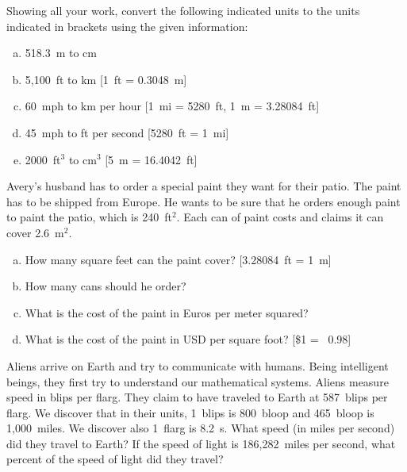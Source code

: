 \documentclass[11pt,letterpaper]{article}
\begin{document}

 Showing all your work, convert the following indicated units to the units indicated in brackets using the given information:
	\begin{enumerate}[(a)]
	\item 518.3~m to cm
	\item 5,100~ft to km [1~ft = 0.3048~m]
	\item 60~mph to km per hour [1~mi = 5280~ft, 1~m = 3.28084~ft]
	\item 45~mph to ft per second [5280~ft = 1~mi]
	\item 2000~ft$^3$ to cm$^3$ [5~m = 16.4042~ft]
	\end{enumerate}



\newpage



 Avery's husband has to order a special paint they want for their patio. The paint has to be shipped from Europe. He wants to be sure that he orders enough paint to paint the patio, which is 240~ft$^2$. Each can of paint costs  and claims it can cover 2.6~m$^2$.
	\begin{enumerate}[(a)]
	\item How many square feet can the paint cover? [3.28084~ft = 1~m]
	\item How many cans should he order?
	\item What is the cost of the paint in Euros per meter squared?
	\item What is the cost of the paint in USD per square foot? [\$1 = \texteuro\ 0.98]
	\end{enumerate}



\newpage



 Aliens arrive on Earth and try to communicate with humans. Being intelligent beings, they first try to understand our mathematical systems. Aliens measure speed in blips per flarg. They claim to have traveled to Earth at 587~blips per flarg. We discover that in their units, 1~blips is 800~bloop and 465~bloop is 1,000~miles. We discover also 1~flarg is 8.2~s. What speed (in miles per second) did they travel to Earth? If the speed of light is 186,282~miles per second, what percent of the speed of light did they travel?
\end{document}
